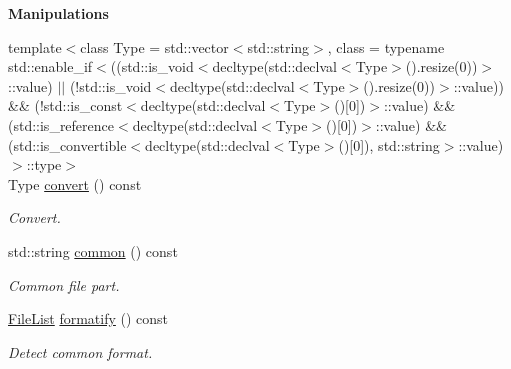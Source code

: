 \begin{Indent}{\bf Manipulations}\par
\begin{DoxyCompactItemize}
\item 
{\footnotesize template$<$class Type  = std\-::vector$<$std\-::string$>$, class  = typename std\-::enable\-\_\-if$<$((std\-::is\-\_\-void$<$decltype(std\-::declval$<$\-Type$>$().\-resize(0))$>$\-::value) $|$$|$ (!std\-::is\-\_\-void$<$decltype(std\-::declval$<$\-Type$>$().\-resize(0))$>$\-::value)) \&\& (!std\-::is\-\_\-const$<$decltype(std\-::declval$<$\-Type$>$()\mbox{[}0\mbox{]})$>$\-::value) \&\& (std\-::is\-\_\-reference$<$decltype(std\-::declval$<$\-Type$>$()\mbox{[}0\mbox{]})$>$\-::value) \&\& (std\-::is\-\_\-convertible$<$decltype(std\-::declval$<$\-Type$>$()\mbox{[}0\mbox{]}), std\-::string$>$\-::value)$>$\-::type$>$ }\\Type \hyperlink{exceptionmagrathea_1_1FileList_ac9890bbe8cd72a12476da5613dcb1fb6}{convert} () const 
\begin{DoxyCompactList}\small\item\em Convert. \end{DoxyCompactList}\item 
std\-::string \hyperlink{exceptionmagrathea_1_1FileList_aacc9ee4d2e9aa81f4b47871a34dff04a}{common} () const 
\begin{DoxyCompactList}\small\item\em Common file part. \end{DoxyCompactList}\item 
\hyperlink{exceptionmagrathea_1_1FileList}{File\-List} \hyperlink{exceptionmagrathea_1_1FileList_a2e48d515e291aad0b29506f02a4e18c4}{formatify} () const 
\begin{DoxyCompactList}\small\item\em Detect common format. \end{DoxyCompactList}\end{DoxyCompactItemize}
\end{Indent}
